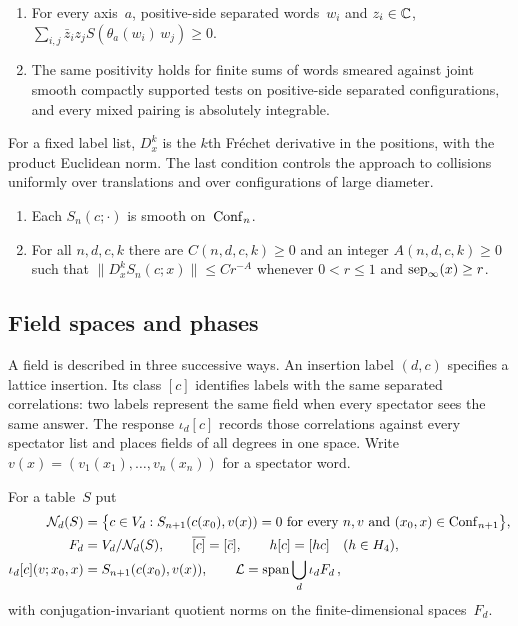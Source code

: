 \begin{definition}\label{def:E4-E5}
\begin{enumerate}[label=\textup{(E\arabic*)},ref=E\arabic*,start=4,nosep]
\item\label{it:E4} For every axis~$a$, positive-side separated words~$w_i$ and $z_i\in\mathbb{C}$, $\sum_{i,j}\bar z_iz_jS(\theta_a(w_i)\,w_j)\ge0$.
\item\label{it:E5} The same positivity holds for finite sums of words smeared against joint smooth compactly supported tests on positive-side separated configurations, and every mixed pairing is absolutely integrable.
\end{enumerate}
\end{definition}

For a fixed label list, $D_x^k$ is the $k$th Fr\'echet derivative in the positions, with the product Euclidean norm. The last condition controls the approach to collisions uniformly over translations and over configurations of large diameter.

\begin{definition}\label{def:E6-E7}
\begin{enumerate}[label=\textup{(E\arabic*)},ref=E\arabic*,start=6,nosep]
\item\label{it:E6} Each $S_n(c;\cdot)$ is smooth on~$\mathrm{Conf}_{n}$.
\item\label{it:E7} For all $n,d,c,k$ there are $C(n,d,c,k)\ge0$ and an integer $A(n,d,c,k)\ge0$ such that $\|D_x^kS_n(c;x)\|\le Cr^{-A}$ whenever $0<r\le1$ and $\operatorname{sep}_{\infty}(x)\ge r$.
\end{enumerate}
\end{definition}

\subsection{Field spaces and phases}\label{sec:field-spaces}

A field is described in three successive ways. An insertion label $(d,c)$ specifies a lattice insertion. Its class $[c]$ identifies labels with the same separated correlations: two labels represent the same field when every spectator sees the same answer. The response $\iota_d[c]$ records those correlations against every spectator list and places fields of all degrees in one space. Write $v(x)=(v_1(x_1),\ldots,v_n(x_n))$ for a spectator word.

\begin{definition}\label{def:D10}
For a table~$S$ put
\begin{align*}
\mathcal{N}_{d}(S)&=\bigl\{c\in V_d:S_{n+1}(c(x_0),v(x))=0\text{ for every }n,v\text{ and }(x_0,x)\in\mathrm{Conf}_{n+1}\bigr\},\\
F_d&=V_d/\mathcal{N}_{d}(S),\qquad \overline{[c]}=[\bar c],\qquad h[c]=[hc]\quad(h\in H_4),\\
\iota_d[c](v;x_0,x)&=S_{n+1}(c(x_0),v(x)),\qquad
\mathcal L=\operatorname{span}\bigcup_d\iota_dF_d\,,
\end{align*}
with conjugation-invariant quotient norms on the finite-dimensional spaces~$F_d$.
\end{definition}

